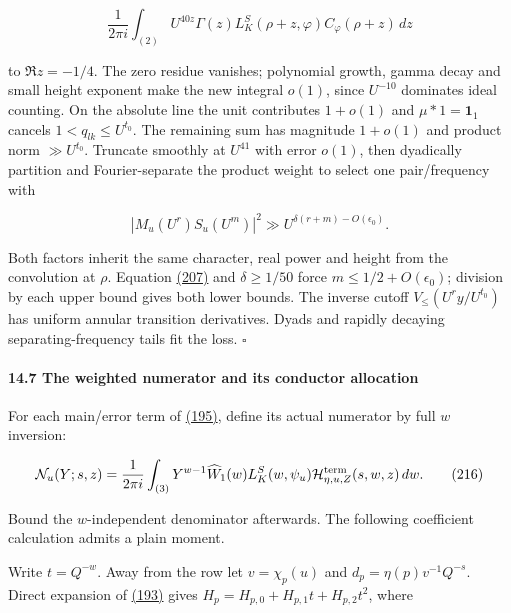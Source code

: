 \[
\frac1{2\pi i}\int_{(2)}U^{40z}\Gamma(z)
 L_K^S(\rho+z,\varphi)C_\varphi(\rho+z)\,dz
\]

to \(\Re z=-1/4\). The zero residue vanishes; polynomial growth, gamma decay and small height exponent make the new integral \(o(1)\), since \(U^{-10}\) dominates ideal counting. On the absolute line the unit contributes \(1+o(1)\) and \(\mu*1=\mathbf1_1\) cancels \(1<q_{lk}\le U^{t_0}\). The remaining sum has magnitude \(1+o(1)\) and product norm \(\gg U^{t_0}\). Truncate smoothly at \(U^{41}\) with error \(o(1)\), then dyadically partition and Fourier-separate the product weight to select one pair/frequency with

\[
|M_u(U^r)S_u(U^m)|^2
 \gg U^{\delta(r+m)-O(\epsilon_0)}.
\]

Both factors inherit the same character, real power and height from the convolution at \(\rho\). Equation \protect\hyperlink{dr:saturation-upper}{(207)} and \(\delta\ge1/50\) force \(m\le1/2+O(\epsilon_0)\); division by each upper bound gives both lower bounds. The inverse cutoff \(V_\le(U^ry/U^{t_0})\) has uniform annular transition derivatives. Dyads and rapidly decaying separating-frequency tails fit the loss. \(\square\)

\hypertarget{dr:count}{}

\label{dr:count}

\hypertarget{the-weighted-numerator-and-its-conductor-allocation}{%
\paragraph{14.7 The weighted numerator and its conductor allocation}\label{the-weighted-numerator-and-its-conductor-allocation}}

For each main/error term of \protect\hyperlink{dr:Hcomp}{(195)}, define its actual numerator by full \(w\) inversion:

\hypertarget{dr:N}{}

\label{dr:N}

\[
\mathcal N_u(Y;s,z)=\frac1{2\pi i}\int_{(3)}Y^{w-1}
 \widehat W_1(w)L_K^S(w,\psi_u)
 \mathcal H^{\rm term}_{\eta,u,Z}(s,w,z)\,dw.
 \qquad\text{(216)}
\]

Bound the \(w\)-independent denominator afterwards. The following coefficient calculation admits a plain moment.

Write \(t=Q^{-w}\). Away from the row let \(v=\chi_p(u)\) and \(d_p=\eta(p)v^{-1}Q^{-s}\). Direct expansion of \protect\hyperlink{dr:Euler-table}{(193)} gives \(H_p=H_{p,0}+H_{p,1}t+H_{p,2}t^2\), where

